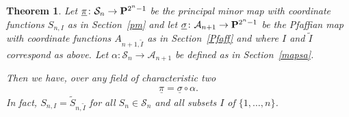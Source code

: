 \documentclass[10pt,a4paper]{amsart}
\newcommand{\PP}{{\bf P}}
\newcommand{\cA}{{\cal A}}
\newcommand{\cS}{{\cal S}}
\newcommand{\tI}{{\tilde{I}}}
\newcommand{\tS}{{\tilde{S}}}
\numberwithin{equation}{section}
\newtheorem{Theorem}{Theorem}[section]
\providecommand{\cal}{\mathcal}
\begin{document}
\begin{Theorem} \label{thm} Let $\underline{\pi}\colon \cS_n\rightarrow\PP^{2^n-1}$ be the principal minor map with coordinate functions $S_{n,I}$ as in Section~{\rm \ref{pm}} and let $\underline{\sigma}\colon \cA_{n+1}\rightarrow\PP^{2^n-1}$ be the Pfaffian map with coordinate functions $A_{n+1,\tI}$ as in Section~{\rm \ref{Pfaff}} and where $I$ and $\tI$ correspond as above. Let $\alpha\colon \cS_n\rightarrow\cA_{n+1}$ be defined as in Section~{\rm \ref{mapsa}}.

Then we have, over any field of characteristic two
\begin{gather*}
\underline{\pi} = \underline{\sigma}\circ\alpha.
\end{gather*}
In fact, $S_{n,I}=\tS_{n,\tI}$ for all $S_n\in \cS_n$ and all subsets $I$ of $\{1,\ldots,n\}$.
\end{Theorem}
\end{document}
